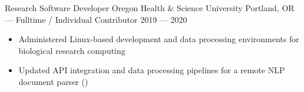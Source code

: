 \vspace*{\baselineskip}

\showoff
{Research Software Developer}
{Oregon Health \& Science University}
{Portland, OR --- Fulltime / Individual Contributor}
{2019 --- 2020}

\begin{itemize}
    \item Administered Linux-based development and data processing environments for biological research computing
    \item Updated API integration and data processing pipelines for a remote NLP document parser ()
\end{itemize}





\vfill \myBreak{}


